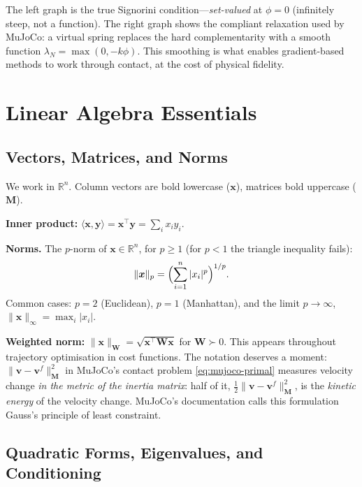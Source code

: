 \documentclass[11pt,twoside]{report}
\theoremstyle{definition}
\theoremstyle{plain}
\theoremstyle{remark}
\newcommand{\R}{\mathbb{R}}
\newcommand{\x}{\bm{x}}
\newcommand{\0}{\bm{0}}
\newcommand{\M}{\bm{M}}
\begin{document}
The left graph is the true Signorini condition---\emph{set-valued} at $\phi=0$ (infinitely steep, not a function). The right graph shows the compliant relaxation used by MuJoCo: a virtual spring replaces the hard complementarity with a smooth function $\lambda_{N}=\max(0,-k\phi)$. This smoothing is what enables gradient-based methods to work through contact, at the cost of physical fidelity.


\chapter{Linear Algebra Essentials}
\label{ch:linalg}

\section{Vectors, Matrices, and Norms}

We work in $\R^{n}$.  Column vectors are bold lowercase ($\x$),
matrices bold uppercase ($\M$).

\textbf{Inner product:}
$\langle\x,\bm{y}\rangle=\x^{\!\top}\bm{y}=\sum_{i}x_{i}y_{i}$.

\textbf{Norms.}
The $p$-norm of $\x\in\R^{n}$, for $p\ge 1$ (for $p<1$ the triangle inequality fails):
\begin{equation}
\|\x\|_{p}=\Bigl(\sum_{i=1}^{n}|x_{i}|^{p}\Bigr)^{1/p}.
\end{equation}
Common cases: $p=2$ (Euclidean), $p=1$ (Manhattan), and the limit $p\to\infty$, $\|\x\|_{\infty}=\max_{i}|x_{i}|$.

\textbf{Weighted norm:}
$\|\x\|_{\bm{W}}=\sqrt{\x^{\!\top}\bm{W}\x}$ for
$\bm{W}\succ 0$.
This appears throughout trajectory optimisation in cost functions.
The notation deserves a moment: $\|\bm{v}-\bm{v}^{f}\|_{\M}^{2}$ in
MuJoCo's contact problem \eqref{eq:mujoco-primal} measures velocity
change \emph{in the metric of the inertia matrix}: half of it,
$\tfrac12\|\bm{v}-\bm{v}^{f}\|_{\M}^{2}$, is the \emph{kinetic energy} of the velocity change. MuJoCo's
documentation calls this formulation Gauss's principle of least constraint.

\section{Quadratic Forms, Eigenvalues, and Conditioning}
\label{sec:quadratic-forms}
\end{document}
